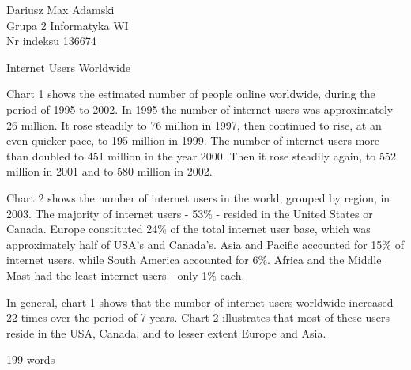 \documentclass[12pt]{article}
\begin{document}

\begin{flushleft} 
	Dariusz Max Adamski \\
	Grupa 2 Informatyka WI\\
	Nr indeksu 136674
\end{flushleft}

\begin{center} 
	\vspace{0.8cm} \Large
	Internet Users Worldwide
	\vspace{0.5cm}
\end{center}

Chart 1 shows the estimated number of people online worldwide, during the period of 1995 to 2002. In 1995 the number of internet users was approximately 26 million. It rose steadily to 76 million in 1997, then continued to rise, at an even quicker pace, to 195 million in 1999. The number of internet users more than doubled to 451 million in the year 2000. Then it rose steadily again, to 552 million in 2001 and to 580 million in 2002.

Chart 2 shows the number of internet users in the world, grouped by region, in 2003. The majority of internet users - 53\% - resided in the United States or Canada. Europe constituted 24\% of the total internet user base, which was approximately half of USA’s and Canada’s. Asia and Pacific accounted for 15\% of internet users, while South America accounted for 6\%. Africa and the Middle Mast had the least internet users - only 1\% each.

In general, chart 1 shows that the number of internet users worldwide increased 22 times over the period of 7 years. Chart 2 illustrates that most of these users reside in the USA, Canada, and to lesser extent Europe and Asia.

199 words
\end{document}
